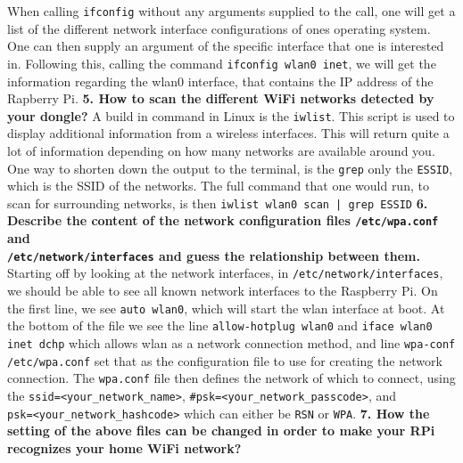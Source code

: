 \documentclass[a4paper,oneside,onecolumn]{article}
\newcommand{\code}[1]{\colorbox{codegray}{\texttt{#1}}}
\begin{document}
\newline
\newline
When calling \code{ifconfig} without any arguments supplied to the call, one will get a list of the different network interface configurations of ones operating system. One can then supply an argument of the specific interface that one is interested in. Following this, calling the command \code{ifconfig wlan0 inet}, we will get the information regarding the wlan0 interface, that contains the IP address of the Rapberry Pi.
\newline
\newline
\noindent
\textbf{5. How to scan the different WiFi networks detected by your dongle?}
\newline
\newline
A build in command in Linux is the \code{iwlist}. This script is used to display additional information from a wireless interfaces. This will return quite a lot of information depending on how many networks are available around you. One way to shorten down the output to the terminal, is the \texttt{grep} only the \texttt{ESSID}, which is the SSID of the networks. The full command that one would run, to scan for surrounding networks, is then \code{iwlist wlan0 scan | grep ESSID}
\newpage
\noindent
\textbf{6. Describe the content of the network configuration files \texttt{/etc/wpa.conf} and \\ \texttt{/etc/network/interfaces}
and guess the relationship between them.}
\newline
\newline
Starting off by looking at the network interfaces, in \texttt{/etc/network/interfaces}, we should be able to see all known network interfaces to the Raspberry Pi. On the first line, we see \code{auto wlan0}, which will start the wlan interface at boot. At the bottom of the file we see the line \code{allow-hotplug wlan0} and \code{iface wlan0 inet dchp} which allows wlan as a network connection method, and line \code{wpa-conf /etc/wpa.conf} set that as the configuration file to use for creating the network connection.
The \texttt{wpa.conf} file then defines the network of which to connect, using the \code{ssid=<your\_network\_name>}, \code{\#psk=<your\_network\_passcode>}, and \\ \code{psk=<your\_network\_hashcode>} which can either be \texttt{RSN} or \texttt{WPA}.
\newline
\newline
\noindent
\textbf{7. How the setting of the above files can be changed in order to make your RPi recognizes your home
WiFi network?}
\end{document}
